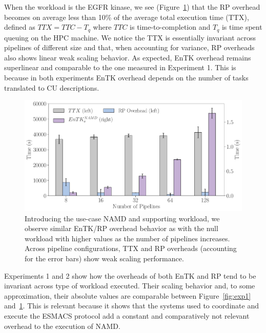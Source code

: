 
When the workload is the EGFR kinase, we see (Figure~\ref{fig:exp2}) that the RP
overhead becomes on average less than 10\% of the average total execution time
(TTX), defined as \(TTX = TTC - T_q\) where \(TTC\) is time-to-completion and
\(T_q\)%
is time spent queuing on the HPC machine. We notice the TTX is essentially
invariant 
across pipelines of different size and that, when accounting for variance, RP
overheads also shows linear weak scaling behavior. As expected, EnTK overhead
remains superlinear and comparable to the one measured in Experiment 1. This
is because in both experiments EnTK overhead depends on the number of tasks
translated to CU descriptions.

\begin{figure}
  \centering
  \includegraphics[width=\columnwidth]{FIGURES/namd_workload_overheads.pdf}
  \caption{Introducing the use-case NAMD and supporting workload, we observe
  similar EnTK/RP overhead behavior as with the null workload with higher
  values as the number of pipelines increases. Across pipeline
  configurations, TTX and RP overheads (accounting for the error bars) show %
  weak scaling performance.}\label{fig:exp2}
\end{figure}


Experiments 1 and 2 show how the overheads of both EnTK and RP tend to be
invariant across type of workload executed. Their scaling behavior and, to
some approximation, their absolute values are comparable between
Figure~\ref{fig:exp1} and~\ref{fig:exp2}. This is relevant because it shows
that the systems used to coordinate and execute the ESMACS protocol add a
constant and comparatively not relevant overhead to the execution of NAMD\@.

